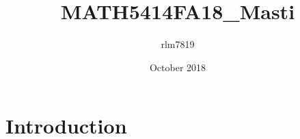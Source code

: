 \documentclass{article}
\title{MATH5414FA18_Masti}
\author{rlm7819 }
\date{October 2018}
\begin{document}
\maketitle

\section{Introduction}
\end{document}
